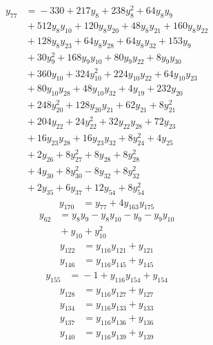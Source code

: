 \begin{align*}
y_{77} &={} -330 +217y_{8} +238y_{8}^{2} +64y_{8}y_{9} \\
 &{} +512y_{8}y_{10} +120y_{8}y_{20} +48y_{8}y_{21} +160y_{8}y_{22} \\
 &{} +128y_{8}y_{23} +64y_{8}y_{28} +64y_{8}y_{32} +153y_{9} \\
 &{} +30y_{9}^{2} +168y_{9}y_{10} +80y_{9}y_{22} +8y_{9}y_{30} \\
 &{} +360y_{10} +324y_{10}^{2} +224y_{10}y_{22} +64y_{10}y_{23} \\
 &{} +80y_{10}y_{28} +48y_{10}y_{32} +4y_{19} +232y_{20} \\
 &{} +248y_{20}^{2} +128y_{20}y_{21} +62y_{21} +8y_{21}^{2} \\
 &{} +204y_{22} +24y_{22}^{2} +32y_{22}y_{28} +72y_{23} \\
 &{} +16y_{23}y_{28} +16y_{23}y_{32} +8y_{24}^{2} +4y_{25} \\
 &{} +2y_{26} +8y_{27}^{2} +8y_{28} +8y_{28}^{2} \\
 &{} +4y_{30} +8y_{30}^{2} -8y_{32} +8y_{32}^{2} \\
 &{} +2y_{35} +6y_{37} +12y_{54} +8y_{54}^{2}
\end{align*}
\begin{align*}
y_{170} &={} y_{77} +4y_{163}y_{175}
\end{align*}
\begin{align*}
y_{62} &={} y_{8}y_{9} -y_{8}y_{10} -y_{9} -y_{9}y_{10} \\
 &{} +y_{10} +y_{10}^{2}
\end{align*}
\begin{align*}
y_{122} &={} y_{116}y_{121} +y_{121}
\end{align*}
\begin{align*}
y_{146} &={} y_{116}y_{145} +y_{145}
\end{align*}
\begin{align*}
y_{155} &={} -1 +y_{116}y_{154} +y_{154}
\end{align*}
\begin{align*}
y_{128} &={} y_{116}y_{127} +y_{127}
\end{align*}
\begin{align*}
y_{134} &={} y_{116}y_{133} +y_{133}
\end{align*}
\begin{align*}
y_{137} &={} y_{116}y_{136} +y_{136}
\end{align*}
\begin{align*}
y_{140} &={} y_{116}y_{139} +y_{139}
\end{align*}

